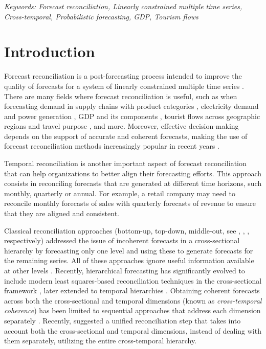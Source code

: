 \documentclass[a4paper,11pt]{article}
\theoremstyle{definition}
\begin{document}
\noindent%
{\it Keywords: Forecast reconciliation, Linearly constrained multiple time series, Cross-temporal, Probabilistic forecasting, GDP, Tourism flows}
\vfill

\newpage
{}


\section{Introduction}

Forecast reconciliation is a post-forecasting process intended to improve the quality of forecasts for a system of linearly constrained multiple time series \citep{hyndman2011, panagiotelis2021}. There are many fields where forecast reconciliation is useful, such as when forecasting demand in supply chains with product categories \citep{punia2020, kourentzes2021}, electricity demand and power generation \citep{spiliotis2020, bentaieb2021}, GDP and its components \citep{athanasopoulos2020}, tourist flows across geographic regions and travel purpose \citep{kourentzes2019}, and more. Moreover, effective decision-making depends on the support of accurate and coherent forecasts, making the use of forecast reconciliation methods increasingly popular in recent years \citep{athanasopoulos2023}. 

Temporal reconciliation is another important aspect of forecast reconciliation that can help organizations to better align their forecasting efforts. This approach consists in reconciling forecasts that are generated at different time horizons, such monthly, quarterly or annual. For example, a retail company may need to reconcile monthly forecasts of sales with quarterly forecasts of revenue to ensure that they are aligned and consistent. %

Classical reconciliation approaches (bottom-up, top-down, middle-out, see \citealp{dunn1976}, \citealp{gross1990}, \citealp{athanasopoulos2009}, respectively) addressed the issue of incoherent forecasts in a cross-sectional hierarchy by forecasting only one level and using these to generate forecasts for the remaining series. All of these approaches ignore useful information available at other levels \citep{pennings2017}. Recently, hierarchical forecasting \citep{fliedner2001} has significantly evolved to include modern least squares-based reconciliation techniques in the cross-sectional framework \citep{hyndman2011, wickramasuriya2019, panagiotelis2021}, later extended to temporal hierarchies \citep{athanasopoulos2017, nystrup2020}.
Obtaining coherent forecasts across both the cross-sectional and temporal dimensions (known as \textit{cross-temporal coherence}) has been limited to sequential approaches that address each dimension separately \citep{kourentzes2019, yagli2019, punia2020, spiliotis2020}. Recently, \citet{difonzo2023} suggested a unified reconciliation step that takes into account both the cross-sectional and temporal dimensions, instead of dealing with them separately, utilizing the entire cross-temporal hierarchy.
\end{document}

